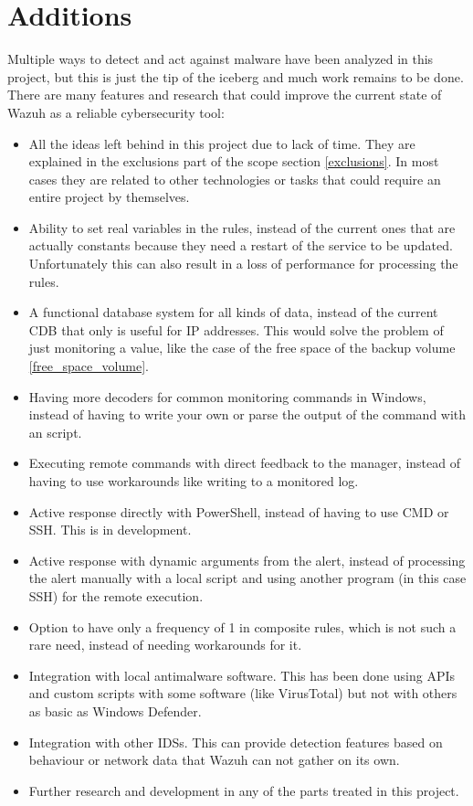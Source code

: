 \section{Additions}
Multiple ways to detect and act against malware have been analyzed in this project, but this is just the tip of the iceberg and much work remains to be done.
There are many features and research that could improve the current state of Wazuh as a reliable cybersecurity tool:
\begin{itemize}
	\item All the ideas left behind in this project due to lack of time. They are explained in the exclusions part of the scope section \ref{exclusions}.
In most cases they are related to other technologies or tasks that could require an entire project by themselves.
	\item Ability to set real variables in the rules, instead of the current ones that are actually constants because they need a restart of the service to be updated.
Unfortunately this can also result in a loss of performance for processing the rules.
	\item A functional database system for all kinds of data, instead of the current CDB that only is useful for IP addresses. This would solve the problem of just monitoring a value, like the case of the free space of the backup volume \ref{free_space_volume}.
	\item Having more decoders for common monitoring commands in Windows, instead of having to write your own or parse the output of the command with an script.
	\item Executing remote commands with direct feedback to the manager, instead of having to use workarounds like writing to a monitored log.
	\item Active response directly with PowerShell, instead of having to use CMD or SSH. This is in development.
	\item Active response with dynamic arguments from the alert, instead of processing the alert manually with a local script and using another program (in this case SSH) for the remote execution.
	\item Option to have only a frequency of 1 in composite rules, which is not such a rare need, instead of needing workarounds for it.
	\item Integration with local antimalware software. This has been done using APIs and custom scripts with some software (like VirusTotal) but not with others as basic as Windows Defender.
	\item Integration with other IDSs. This can provide detection features based on behaviour or network data that Wazuh can not gather on its own.
	\item Further research and development in any of the parts treated in this project.
\end{itemize}
